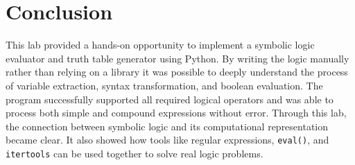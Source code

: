 \documentclass[a4paper, journal]{IEEEtran}
\begin{document}
\section{Conclusion}
This lab provided a hands-on opportunity to implement a symbolic logic evaluator and truth table generator using Python. By writing the logic manually rather than relying on a library it was possible to deeply understand the process of variable extraction, syntax transformation, and boolean evaluation. The program successfully supported all required logical operators and was able to process both simple and compound expressions without error. Through this lab, the connection between symbolic logic and its computational representation became clear. It also showed how tools like regular expressions, \texttt{eval()}, and \texttt{itertools} can be used together to solve real logic problems. 
\end{document}

